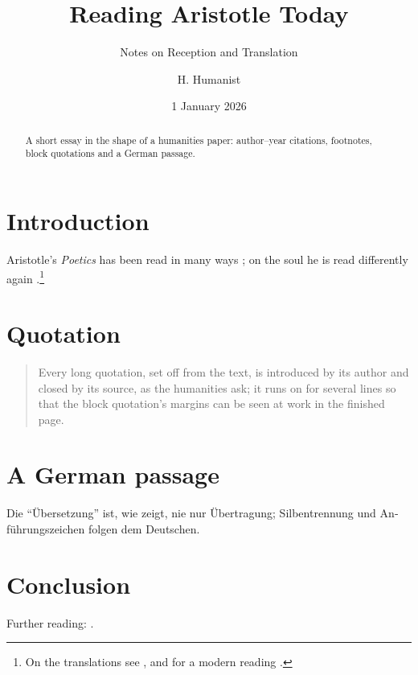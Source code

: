 \documentclass[a4paper,11pt,parskip=half,bibliography=totoc]{scrartcl}
\title{Reading Aristotle Today}
\subtitle{Notes on Reception and Translation}
\author{H. Humanist}
\date{1 January 2026}
\begin{document}
\maketitle
\begin{abstract}
A short essay in the shape of a humanities paper: author--year
citations, footnotes, block quotations and a German passage.
\end{abstract}
\section{Introduction}
Aristotle's \textit{Poetics} has been read in many ways
\autocite{aristotle:poetics}; on the soul he is read differently again
\autocites[12]{aristotle:anima}[see also][]{aristotle:physics}.\footnote{On
the translations see \textcite{aristotle:rhetoric}, and for a modern
reading \textcite{nussbaum}.}
\section{Quotation}
\blockquote[{\cite[45]{augustine}}]{Every long quotation, set off from the
text, is introduced by its author and closed by its source, as the
humanities ask; it runs on for several lines so that the block
quotation's margins can be seen at work in the finished page.}
\section{A German passage}
\begin{otherlanguage}{ngerman}
Die \enquote{Übersetzung} ist, wie \textcite{nietzsche:ksa1} zeigt, nie nur
Übertragung; Silbentrennung und Anführungszeichen folgen dem Deutschen.
\end{otherlanguage}
\section{Conclusion}
Further reading: \cite{kant:kpv,kant:ku,worman}.
\printbibliography
\end{document}
